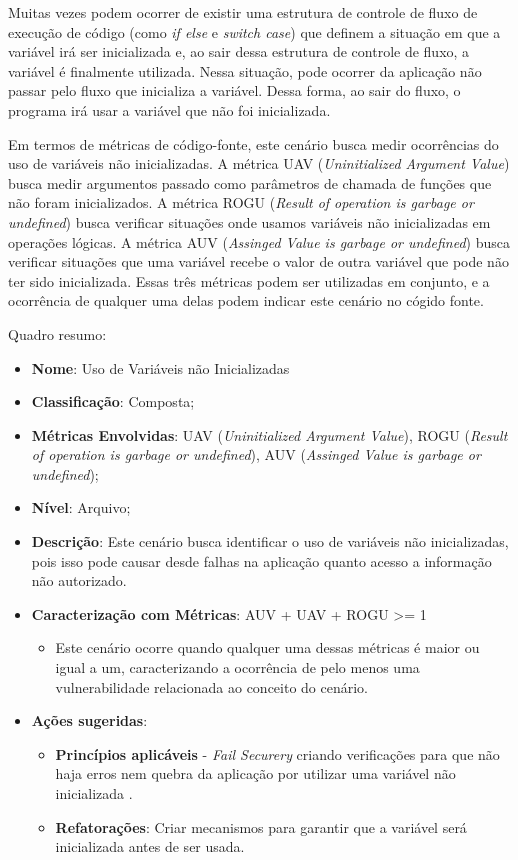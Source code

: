 Muitas vezes podem ocorrer de existir uma estrutura de controle de fluxo de execução de código (como \emph{if else} e \emph{switch case}) que definem a situação em que a variável irá ser inicializada e, ao sair dessa estrutura de controle de fluxo, a variável é finalmente utilizada. Nessa situação, pode ocorrer da aplicação não passar pelo fluxo que inicializa a variável. Dessa forma, ao sair do fluxo, o programa irá usar a variável que não foi inicializada.

Em termos de métricas de código-fonte, este cenário busca medir ocorrências do uso de variáveis não inicializadas. A métrica UAV (\emph{Uninitialized Argument Value}) busca medir argumentos passado como parâmetros de chamada de funções que não foram inicializados. A métrica ROGU (\emph{Result of operation is garbage or undefined}) busca verificar situações onde usamos variáveis não inicializadas em operações lógicas. A métrica AUV (\emph{Assinged Value is garbage or undefined}) busca verificar situações que uma variável recebe o valor de outra variável que pode não ter sido inicializada. Essas três métricas podem ser utilizadas em conjunto, e a ocorrência de qualquer uma delas podem indicar este cenário no cógido fonte.

Quadro resumo:

\begin{itemize}
\item \textbf{Nome}: Uso de Variáveis não Inicializadas
\item \textbf{Classificação}: Composta;
\item \textbf{Métricas Envolvidas}: UAV (\emph{Uninitialized Argument Value}), ROGU (\emph{Result of operation is garbage or undefined}), AUV (\emph{Assinged Value is garbage or undefined});
\item \textbf{Nível}: Arquivo;
\item \textbf{Descrição}: Este cenário busca identificar o uso de variáveis não inicializadas, pois isso pode causar desde falhas na aplicação quanto acesso a informação não autorizado.
\item \textbf{Caracterização com Métricas}: AUV + UAV + ROGU >= 1
	\begin{itemize}
	\item Este cenário ocorre quando qualquer uma dessas métricas é maior ou igual a um, caracterizando a ocorrência de pelo menos uma vulnerabilidade relacionada ao conceito do cenário.
	\end{itemize}
\item \textbf{Ações sugeridas}: 
	\begin{itemize}
	\item \textbf{Princípios aplicáveis} - \emph{Fail Securery} criando verificações para que não haja erros nem quebra da aplicação por utilizar uma variável não inicializada .
	\item \textbf{Refatorações}: Criar mecanismos para garantir que a variável será inicializada antes de ser usada.
	\end{itemize}
\end{itemize}


